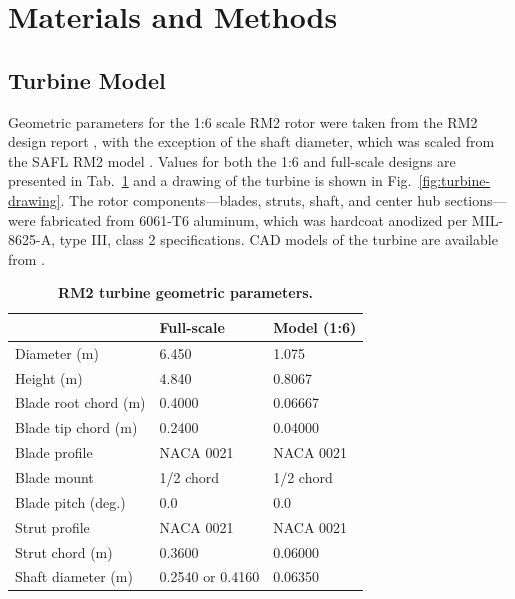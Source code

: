 \documentclass[10pt,letterpaper]{article}
\begin{document}
\section*{Materials and Methods}

\subsection*{Turbine Model}

Geometric parameters for the 1:6 scale RM2 rotor were taken from the RM2 design
report \cite{Barone2011}, with the exception of the shaft diameter, which was
scaled from the SAFL RM2 model \cite{Hill2014}. Values for both the 1:6 and
full-scale designs are presented in Tab.~\ref{tab:turb-geom} and a drawing of
the turbine is shown in Fig.~\ref{fig:turbine-drawing}. The rotor
components---blades, struts, shaft, and center hub sections---were fabricated
from 6061-T6 aluminum, which was hardcoat anodized per MIL-8625-A, type III,
class 2 specifications. CAD models of the turbine are available from
\cite{Bachant2015-RM2-CAD}.

\begin{table}[ht]
\centering
\begin{tabular}{l|l|l}
   & Full-scale & Model (1:6) \\
\hline
Diameter (m)   & 6.450 & 1.075 \\
Height (m)     & 4.840 & 0.8067 \\
Blade root chord (m) & 0.4000 & 0.06667 \\
Blade tip chord (m)  & 0.2400 & 0.04000 \\
Blade profile & NACA 0021 & NACA 0021 \\
Blade mount & 1/2 chord & 1/2 chord \\
Blade pitch (deg.) & 0.0 & 0.0 \\
Strut profile & NACA 0021 & NACA 0021 \\
Strut chord (m) & 0.3600 & 0.06000 \\
Shaft diameter (m) & 0.2540 \cite{Beam2011} or 0.4160 \cite{Hill2014} & 0.06350\\
\end{tabular}
\caption{\textbf{RM2 turbine geometric parameters.}}
\label{tab:turb-geom}
\end{table}
\end{document}
